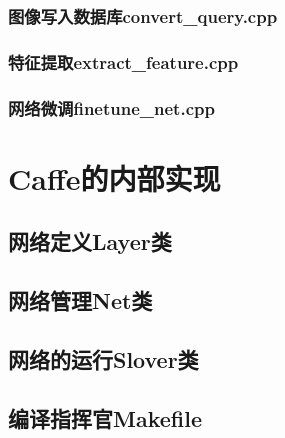 \documentclass{../CNTeXBookTemplate/NanCNBook}
\begin{document}
\section{图像写入数据库convert\_query.cpp}


                    
\section{特征提取extract\_feature.cpp}

\section{网络微调finetune\_net.cpp}

\part{Caffe的内部实现}











\chapter{网络定义Layer类}

\chapter{网络管理Net类}

\chapter{网络的运行Slover类}




\begin{cnappendix}
\chapter{编译指挥官Makefile}

\end{cnappendix}
\end{document}
